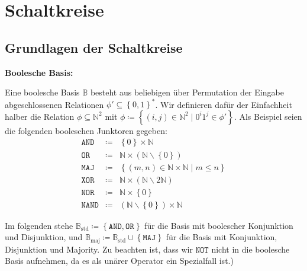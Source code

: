 
\chapter{Schaltkreise}

\section{Grundlagen der Schaltkreise}
\begin{defn}
\textbf{Boolesche Basis:} 

Eine boolesche Basis $\mathbb{B}$ besteht aus beliebigen über Permutation
der Eingabe abgeschlossenen Relationen $\phi'\subseteq\left\{ 0,1\right\} ^{*}$.
Wir definieren dafür der Einfachheit halber die Relation $\phi\subseteq\mathbb{N}^{2}$
mit $\phi\coloneqq\left\{ \left(i,j\right)\in\mathbb{N}^{2}\mid0^{i}1^{j}\in\phi'\right\} $.
Als Beispiel seien die folgenden booleschen Junktoren gegeben: 
\begin{eqnarray*}
\mathtt{AND} & \coloneqq & \left\{ 0\right\} \times\mathbb{N}\\
\mathtt{OR} & \coloneqq & \mathbb{N}\times\left(\mathbb{N}\backslash\left\{ 0\right\} \right)\\
\mathtt{MAJ} & \coloneqq & \left\{ \left(m,n\right)\in\mathbb{N}\times\mathbb{N}\mid m\leqslant n\right\} \\
\mathtt{XOR} & \coloneqq & \mathbb{N}\times\left(\mathbb{N}\backslash2\mathbb{N}\right)\\
\mathtt{NOR} & \coloneqq & \mathbb{N}\times\left\{ 0\right\} \\
\mathtt{NAND} & \coloneqq & \left(\mathbb{N}\backslash\left\{ 0\right\} \right)\times\mathbb{N}
\end{eqnarray*}

Im folgenden stehe $\mathbb{B}_{\mathrm{std}}\coloneqq\left\{ \mathtt{AND},\mathtt{OR}\right\} $
für die Basis mit boolescher Konjunktion und Disjunktion, und $\mathbb{B}_{\mathrm{maj}}\coloneqq\mathbb{B}_{\mathrm{std}}\cup\left\{ \mathtt{MAJ}\right\} $
für die Basis mit Konjunktion, Disjunktion und Majority. Zu beachten
ist, dass wir $\mathtt{NOT}$ nicht in die boolesche Basis aufnehmen,
da es als unärer Operator ein Spezialfall ist.)
\end{defn}

